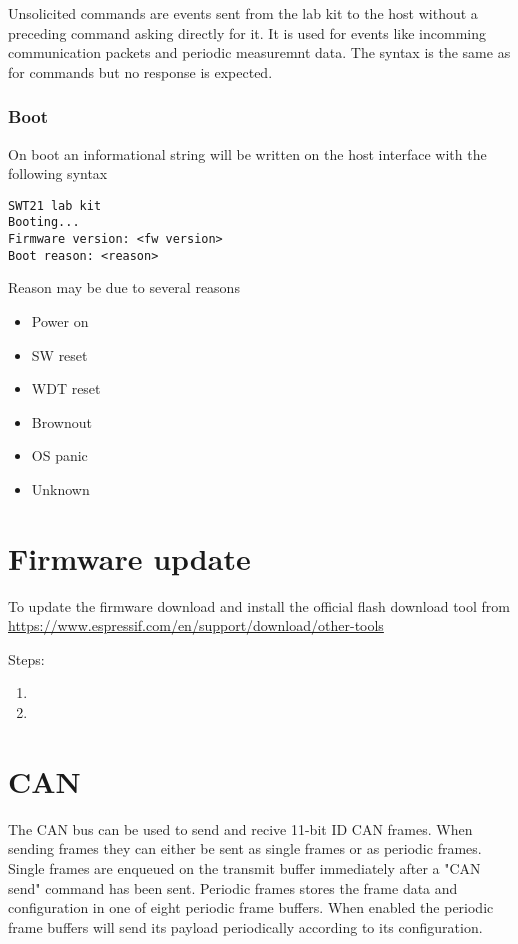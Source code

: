 \documentclass{article}[a4paper]
\begin{document}
Unsolicited commands are events sent from the lab kit to the host without a
preceding command asking directly for it. It is used for events like incomming
communication packets and periodic measuremnt data. The syntax is the same as
for commands but no response is expected.

\subsubsection{Boot}
On boot an informational string will be written on the host interface with
the following syntax

\begin{verbatim}
SWT21 lab kit
Booting...
Firmware version: <fw version>
Boot reason: <reason>
\end{verbatim}

Reason may be due to several reasons
\begin{itemize}
\item Power on
\item SW reset
\item WDT reset
\item Brownout
\item OS panic
\item Unknown
\end{itemize}

\section{Firmware update}
To update the firmware download and install the official flash download tool from
\url{https://www.espressif.com/en/support/download/other-tools}

Steps:
\begin{enumerate}
\item
\item
\end{enumerate}

\section{CAN}
The CAN bus can be used to send and recive 11-bit ID CAN frames.
When sending frames they can either be sent as single frames or as periodic
frames. Single frames are enqueued on the transmit buffer immediately after a
"CAN send" command has been sent. Periodic frames stores the frame data and
configuration in one
of eight periodic frame buffers. When enabled the periodic frame buffers will
send its payload periodically according to its configuration.
\end{document}
